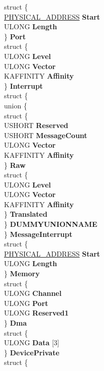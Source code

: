 \begin{DoxyCompactItemize}
\begin{tabbing}
\>struct \{\\
\>\>\hyperlink{union___l_a_r_g_e___i_n_t_e_g_e_r}{PHYSICAL\_ADDRESS} {\bfseries Start}\\
\>\>ULONG {\bfseries Length}\\
\>\} {\bfseries Port}\\
\>struct \{\\
\>\>ULONG {\bfseries Level}\\
\>\>ULONG {\bfseries Vector}\\
\>\>KAFFINITY {\bfseries Affinity}\\
\>\} {\bfseries Interrupt}\\
\>struct \{\\
\>\>union \{\\
\>\>\>struct \{\\
\>\>\>\>USHORT {\bfseries Reserved}\\
\>\>\>\>USHORT {\bfseries MessageCount}\\
\>\>\>\>ULONG {\bfseries Vector}\\
\>\>\>\>KAFFINITY {\bfseries Affinity}\\
\>\>\>\} {\bfseries Raw}\\
\>\>\>struct \{\\
\>\>\>\>ULONG {\bfseries Level}\\
\>\>\>\>ULONG {\bfseries Vector}\\
\>\>\>\>KAFFINITY {\bfseries Affinity}\\
\>\>\>\} {\bfseries Translated}\\
\>\>\} {\bfseries DUMMYUNIONNAME}\\
\>\} {\bfseries MessageInterrupt}\\
\>struct \{\\
\>\>\hyperlink{union___l_a_r_g_e___i_n_t_e_g_e_r}{PHYSICAL\_ADDRESS} {\bfseries Start}\\
\>\>ULONG {\bfseries Length}\\
\>\} {\bfseries Memory}\\
\>struct \{\\
\>\>ULONG {\bfseries Channel}\\
\>\>ULONG {\bfseries Port}\\
\>\>ULONG {\bfseries Reserved1}\\
\>\} {\bfseries Dma}\\
\>struct \{\\
\>\>ULONG {\bfseries Data} \mbox{[}3\mbox{]}\\
\>\} {\bfseries DevicePrivate}\\
\>struct \{\\

\end{tabbing}
\end{DoxyCompactItemize}

